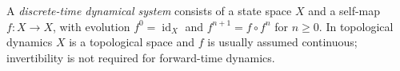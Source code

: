 
A \emph{discrete-time dynamical system} consists of a state space $X$ and a self-map $f:X\to X$, with evolution $f^0=\operatorname{id}_X$ and $f^{n+1}=f\circ f^n$ for $n\ge0$. In topological dynamics $X$ is a topological space and $f$ is usually assumed continuous; invertibility is not required for forward-time dynamics.
